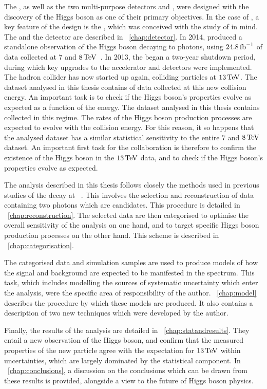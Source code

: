 The \LHC, as well as the two multi-purpose detectors \CMS and \ATLAS, were designed with the discovery of the Higgs boson as one of their primary objectives. In the case of \CMS, a key feature of the design is the \ECAL, which was conceived with the study of \Hgg in mind. The \LHC and the \CMS detector are described in \Chap~\ref{chap:detector}. In 2014, \CMS produced a standalone observation of the Higgs boson decaying to photons, using $24.8\,\text{fb}^{-1}$ of data collected at $7$ and $8\,\text{Te\hspace{-.08em}V}$~\cite{LegacyHgg}. In 2013, the \LHC began a two-year shutdown period, during which key upgrades to the accelerator and detectors were implemented. The hadron collider has now started up again, colliding particles at $13\,\text{Te\hspace{-.08em}V}$. 
\ifNewAnalysis
The dataset analysed in this thesis contains \thisanalysislumi\ifb of data collected at this new collision energy.
An important task is to check if the Higgs boson's properties evolve as expected as a function of the \CoM energy.  
\else
The dataset analysed in this thesis contains \thisanalysislumi\ifb collected in this regime. The rates of the Higgs boson production processes are expected to evolve with the collision energy. For this reason, it so happens that the analysed dataset has a similar statistical sensitivity to the entire $7$ and $8\,\text{Te\hspace{-.08em}V}$ dataset.
An important first task for the \CMS collaboration is therefore to confirm the existence of the Higgs boson in the $13\,\text{Te\hspace{-.08em}V}$ data, and to check if the Higgs boson's properties evolve as expected.  
\fi

The analysis described in this thesis follows closely the methods used in previous studies of the \Hgg decay at \CMS~\cite{LegacyHgg,CMS-PAS-HIG-15-005,CMS-PAS-HIG-16-020}. This involves the selection and reconstruction of data containing two photons which are \Hgg candidates. This procedure is detailed in \Chap~\ref{chap:reconstruction}. The selected data are then categorised to optimise the overall sensitivity of the analysis on one hand, and to target specific Higgs boson production processes on the other hand. This scheme is described in \Chap~\ref{chap:categorisation}. 

The categorised data and simulation samples are used to produce models of how the \Hgg signal and background are expected to be manifested in the \mgg spectrum. This task, which includes modelling the sources of systematic uncertainty which enter the analysis, were the specific area of responsibility of the author. \Chap~\ref{chap:model} describes the procedure by which these models are produced. It also contains a description of two new techniques which were developed by the author.

Finally, the results of the analysis are detailed in \Chap~\ref{chap:statandresults}. They entail a new observation of the Higgs boson, and confirm that the measured properties of the new particle agree with the \SM expectation for $13\,\text{Te\hspace{-.08em}V}$ within uncertainties, which are largely dominated by the statistical component. In \Chap~\ref{chap:conclusions}, a discussion on the conclusions which can be drawn from these results is provided, alongside a view to the future of Higgs boson physics.


